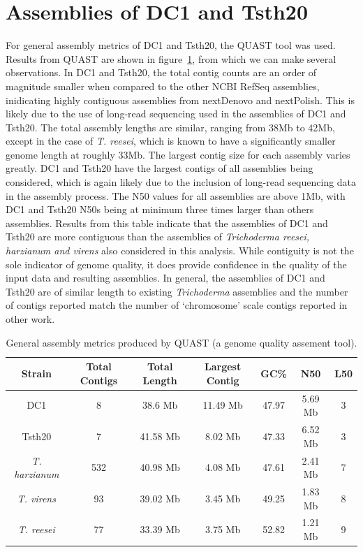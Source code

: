 \section{Assemblies of DC1 and Tsth20}

For general assembly metrics of DC1 and Tsth20, the QUAST tool was
used. Results from QUAST are shown in figure~\ref{table:assemblies},
from which we can make several observations. In DC1 and Tsth20, the
total contig counts are an order of magnitude smaller when compared to
the other NCBI RefSeq assemblies, inidicating highly contiguous
assemblies from nextDenovo and nextPolish. This is likely due to the
use of long-read sequencing used in the assemblies of DC1 and
Tsth20. The total assembly lengths are similar, ranging from 38Mb to
42Mb, except in the case of \textit{T. reesei}, which is known to have
a significantly smaller genome length \cite{Kubicek2019} at roughly
33Mb. The largest contig size for each assembly varies greatly. DC1
and Tsth20 have the largest contigs of all assemblies being
considered, which is again likely due to the inclusion of long-read
sequencing data in the assembly process. The N50 values for all
assemblies are above 1Mb, with DC1 and Tsth20 N50s being at minimum
three times larger than others assemblies. Results from this table
indicate that the assemblies of DC1 and Tsth20 are more contiguous
than the assemblies of \textit{Trichoderma reesei, harzianum and
  virens} also considered in this analysis. While contiguity is not
the sole indicator of genome quality, it does provide confidence in
the quality of the input data and resulting assemblies. In general,
the assemblies of DC1 and Tsth20 are of similar length to existing
\textit{Trichoderma} assemblies and the number of contigs reported
match the number of `chromosome' scale contigs reported in other work.

\begin{table}
  \begin{center}
    \begin{tabular}{|c|c|c|c|c|c|c|}
      \hline
      Strain & Total Contigs & Total Length & Largest Contig & GC\% & N50 & L50 \\ \hline
      DC1 & 8 & 38.6 Mb & 11.49 Mb & 47.97 & 5.69 Mb & 3 \\ \hline
      Tsth20 & 7 & 41.58 Mb & 8.02 Mb & 47.33 & 6.52 Mb & 3 \\ \hline
      \textit{T. harzianum} & 532 & 40.98 Mb & 4.08 Mb & 47.61 & 2.41 Mb & 7 \\ \hline
      \textit{T. virens} & 93 & 39.02 Mb & 3.45 Mb & 49.25 & 1.83 Mb & 8 \\ \hline
      \textit{T. reesei} & 77 & 33.39 Mb & 3.75 Mb & 52.82 & 1.21 Mb & 9 \\ \hline
    \end{tabular}
  \end{center}
  \caption{General assembly metrics produced by QUAST (a
    genome quality assement tool).}
  \label{table:assemblies}
\end{table}


